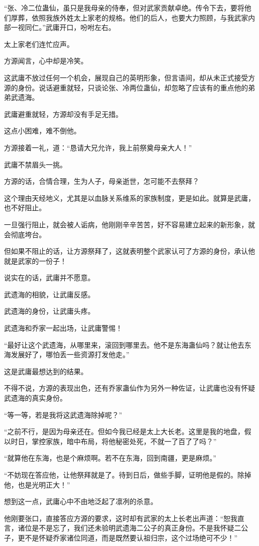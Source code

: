 \begin{this_body}
“张、冷二位蛊仙，虽只是我母亲的侍奉，但对武家贡献卓绝。传令下去，要将他们厚葬，依照我族外姓太上家老的规格。他们的后人，也要大力照顾，与我武家内部一视同仁。”武庸开口，吩咐左右。

太上家老们连忙应声。

方源闻言，心中却是冷笑。

这武庸不放过任何一个机会，展现自己的英明形象，但言语间，却从未正式接受方源的身份。说话避重就轻，只谈论张、冷两位蛊仙，却忽略了应该有的重点他的弟弟武遗海。

武庸避重就轻，方源却没有手足无措。

这点小困难，难不倒他。

方源接着一礼，道：“恳请大兄允许，我上前祭奠母亲大人！”

武庸不禁眉头一挑。

方源的话，合情合理，生为人子，母亲逝世，怎可能不去祭拜？

这个理由天经地义，尤其是以血脉关系维系的家族制度，更是如此。就算是武庸，也不好阻止。

一旦强行阻止，就会被人诟病，他刚刚辛辛苦苦，好不容易建立起来的新形象，就会彻底垮台。

但如果不阻止的话，让方源祭拜了，这就表明整个武家认可了方源的身份，承认他就是武家的一份子！

说实在的话，武庸并不愿意。

武遗海的相貌，让武庸反感。

武遗海的身份，让武庸头疼。

武遗海和乔家一起出场，让武庸警惕！

“最好让这个武遗海，从哪里来，滚回到哪里去。他不是东海蛊仙吗？就让他去东海发展好了，哪怕丢一些资源打发他走。”

这是武庸最想达到的结果。

不得不说，方源的表现出色，还有乔家蛊仙作为另外一种佐证，让武庸也没有怀疑武遗海的真实身份。

“等一等，若是我将这武遗海除掉呢？”

“之前不行，是因为母亲还在。但如今我已经是太上大长老。这里是我的地盘，假以时日，掌控家族，暗中布局，将他秘密处死，不就一了百了了吗？”

“就算他在东海，也是个麻烦啊。若不在东海，回到南疆，更是麻烦。”

“不妨现在答应他，让他祭拜就是了。待到日后，做些手脚，证明他是假的。除掉他，也是光明正大！”

想到这一点，武庸心中不由地泛起了凛冽的杀意。

他刚要张口，直接答应方源的要求，这时却有武家的太上长老出声道：“恕我直言，诸位是不是忘了，我们还未验明武遗海二公子的真正身份。不是我怀疑二公子，更不是怀疑乔家诸位同道，而是既然要认祖归宗，这个过场绝可不少！”


\end{this_body}

